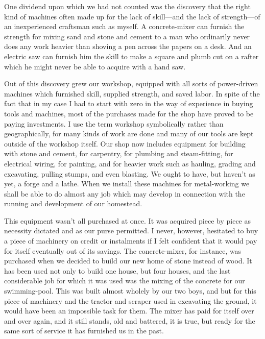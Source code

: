 \documentclass{book}
\begin{document}
One dividend upon which we had not counted was the discovery that the right kind of machines often made up for the lack of skill—and the lack of strength—of an inexperienced craftsman such as myself. A concrete-mixer can furnish the strength for mixing sand and stone and cement to a man who ordinarily never does any work heavier than shoving a pen across the papers on a desk. And an electric saw can furnish him the skill to make a square and plumb cut on a rafter which he might never be able to acquire with a hand saw.

Out of this discovery grew our workshop, equipped with all sorts of power-driven machines which furnished skill, supplied strength, and saved labor. In spite of the fact that in my case I had to start with zero in the way of experience in buying tools and machines, most of the purchases made for the shop have proved to be paying investments. I use the term workshop symbolically rather than geographically, for many kinds of work are done and many of our tools are kept outside of the workshop itself. Our shop now includes equipment for building with stone and cement, for carpentry, for plumbing and steam-fitting, for electrical wiring, for painting, and for heavier work such as hauling, grading and excavating, pulling stumps, and even blasting. We ought to have, but haven’t as yet, a forge and a lathe. When we install these machines for metal-working we shall be able to do almost any job which may develop in connection with the running and development of our homestead.

This equipment wasn’t all purchased at once. It was acquired piece by piece as necessity dictated and as our purse permitted. I never, however, hesitated to buy a piece of machinery on credit or instalments if I felt confident that it would pay for itself eventually out of its savings. The concrete-mixer, for instance, was purchased when we decided to build our new home of stone instead of wood. It has been used not only to build one house, but four houses, and the last considerable job for which it was used was the mixing of the concrete for our swimming-pool. This was built almost wholely by our two boys, and but for this piece of machinery and the tractor and scraper used in excavating the ground, it would have been an impossible task for them. The mixer has paid for itself over and over again, and it still stands, old and battered, it is true, but ready for the same sort of service it has furnished us in the past.
\end{document}
